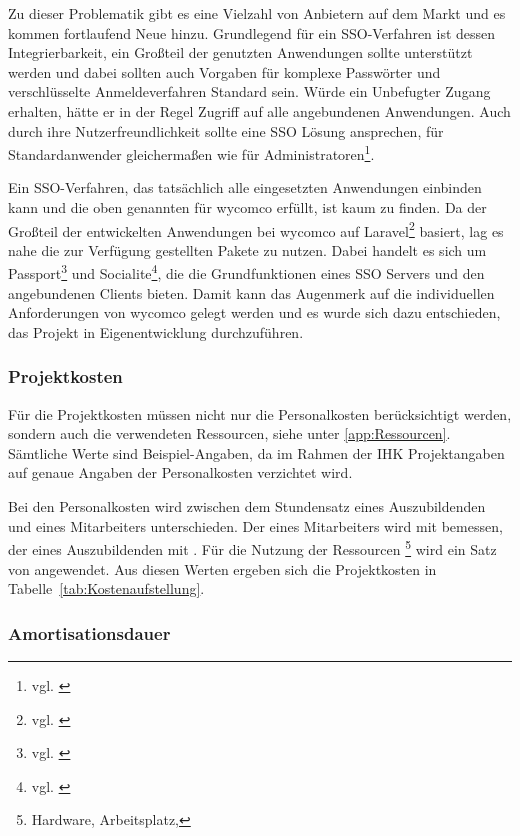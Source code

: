 Zu dieser Problematik gibt es eine Vielzahl von Anbietern auf dem Markt und es kommen fortlaufend Neue hinzu. 
Grundlegend für ein \ac{SSO}-Verfahren ist dessen Integrierbarkeit, ein Großteil der genutzten Anwendungen sollte unterstützt werden und dabei sollten auch Vorgaben für komplexe Passwörter und verschlüsselte Anmeldeverfahren Standard sein. Würde ein Unbefugter Zugang erhalten, hätte er in der Regel Zugriff auf alle angebundenen Anwendungen.
Auch durch ihre Nutzerfreundlichkeit sollte eine \acs{SSO} Lösung ansprechen, für Standardanwender gleichermaßen wie für Administratoren\footnote{vgl. \cite{computerwoche}}.

Ein \ac{SSO}-Verfahren, das tatsächlich alle eingesetzten Anwendungen einbinden kann und die oben genannten für wycomco erfüllt, ist kaum zu finden. Da der Großteil der entwickelten Anwendungen bei wycomco auf Laravel\footnote{vgl. \cite{Laravel}} basiert, lag es nahe die zur Verfügung gestellten Pakete zu nutzen. Dabei handelt es sich um Passport\footnote{vgl. \cite{Passport}} und Socialite\footnote{vgl. \cite{Socialite}}, die die Grundfunktionen eines SSO Servers und den angebundenen Clients bieten. Damit kann das Augenmerk auf die individuellen Anforderungen von wycomco gelegt werden und es wurde sich dazu entschieden, das Projekt in Eigenentwicklung durchzuführen.

\subsubsection{Projektkosten}
\label{sec:Projektkosten}

Für die Projektkosten müssen nicht nur die Personalkosten berücksichtigt werden, sondern auch die verwendeten Ressourcen, siehe unter \ref{app:Ressourcen}. Sämtliche Werte sind Beispiel-Angaben, da im Rahmen der IHK Projektangaben auf genaue Angaben der Personalkosten verzichtet wird. 

Bei den Personalkosten wird zwischen dem Stundensatz eines Auszubildenden und eines Mitarbeiters unterschieden. Der eines Mitarbeiters wird mit  bemessen, der eines Auszubildenden mit .
Für die Nutzung der Ressourcen \footnote{Hardware, Arbeitsplatz, \etc} wird ein Satz von  angewendet.
Aus diesen Werten ergeben sich die Projektkosten in Tabelle~\ref{tab:Kostenaufstellung}.


\subsubsection{Amortisationsdauer}
\label{sec:Amortisationsdauer}

